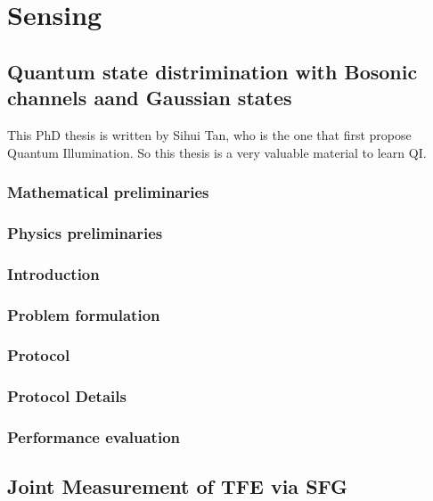 \documentclass[../../note.tex]{subfiles}
\begin{document}
\chapter{Sensing}
\section{Quantum state distrimination with Bosonic channels aand Gaussian states}
This PhD thesis is written by Sihui Tan, who is the one that first propose Quantum Illumination. So this thesis is a very valuable material to learn QI.

\subsection{Mathematical preliminaries}
\begin{definition}
    
\end{definition}

\subsection{Physics preliminaries}


\subsection{Introduction}


\subsection{Problem formulation}

\subsection{Protocol}

\subsection{Protocol Details}


\subsection{Performance evaluation}


\section{Joint Measurement of TFE via SFG \cite{liu2020joint}}
\end{document}
